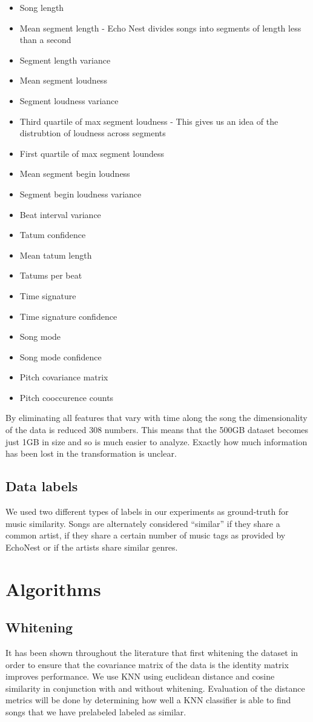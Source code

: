 \documentclass[a4paper,10pt]{article}
\begin{document}
\begin{itemize}
 \item Song length 
 \item Mean segment length - Echo Nest divides songs into segments of length less than a second
 \item Segment length variance
 \item Mean segment loudness
 \item Segment loudness variance
 \item Third quartile of max segment loudness - This gives us an idea of the distrubtion of loudness across segments
 \item First quartile of max segment loundess
 \item Mean segment begin loudness
 \item Segment begin loudness variance
 \item Beat interval variance
 \item Tatum confidence
 \item Mean tatum length
 \item Tatums per beat
 \item Time signature
 \item Time signature confidence
 \item Song mode
 \item Song mode confidence
 \item Pitch covariance matrix
 \item Pitch cooccurence counts
\end{itemize}

By eliminating all features that vary with time along the song the dimensionality of the data is reduced 308 numbers. This means that the 500GB dataset becomes just 1GB in size and so is much easier to analyze. Exactly how much information has been lost in the transformation is unclear. 
\subsection{Data labels}
We used two different types of labels in our experiments as ground-truth for music similarity. Songs are alternately considered ``similar'' if they share a common artist, if they share a certain number of music tags as provided by EchoNest or if the artists share similar genres.
\section{Algorithms}
\subsection{Whitening}
It has been shown throughout the literature that first whitening the dataset in order to ensure that the covariance matrix of the data is the identity matrix improves performance. We use KNN using euclidean distance and cosine similarity in conjunction with and without whitening. Evaluation of the distance metrics will be done by determining how well a KNN classifier is able to find songs that we have prelabeled labeled as similar.
\end{document}
